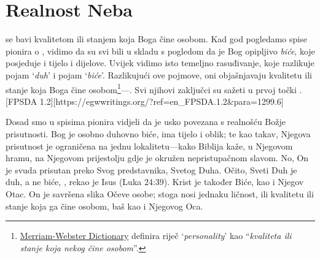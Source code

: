 \chapter{Realnost Neba}

 se bavi kvalitetom ili stanjem koja Boga čine osobom. Kad god pogledamo spise pionira o , vidimo da su svi bili u skladu s pogledom da je Bog opipljivo \textit{biće}, koje posjeduje i tijelo i dijelove. Uvijek vidimo isto temeljno rasuđivanje, koje razlikuje pojam ‘\textit{duh}’ i pojam ‘\textit{biće}’. Razlikujući ove pojmove, oni objašnjavaju kvalitetu ili stanje koja Boga čine osobom\footnote{\href{https://www.merriam-webster.com/dictionary/personality}{Merriam-Webster Dictionary} definira riječ ‘\textit{personality}’ kao “\textit{kvaliteta ili stanje koja nekog čine osobom}”.}—. Svi njihovi zaključci su sažeti u prvoj točki . [FPSDA 1.2][https://egwwritings.org/?ref=en\_FPSDA.1.2&para=1299.6]

Dosad smo u spisima pionira vidjeli da je  usko povezana s realnošću Božje prisutnosti. Bog je osobno duhovno biće, ima tijelo i oblik; te kao takav, Njegova prisutnost je ograničena na jednu lokalitetu—kako Biblija kaže, u Njegovom hramu, na Njegovom prijestolju gdje je okružen nepristupačnom slavom. No, On je svuda prisutan preko Svog predstavnika, Svetog Duha. Očito, Sveti Duh je duh, a ne biće, , rekao je Isus (Luka 24:39). Krist je također Biće, kao i Njegov Otac. On je savršena slika Očeve osobe; stoga nosi jednaku ličnost, ili kvalitetu ili stanje koja ga čine osobom, baš kao i Njegovog Oca.

